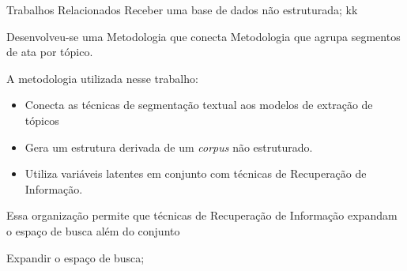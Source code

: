\begin{frame}{Trabalhos Relacionados}
Receber uma base de dados não estruturada;
kk


Desenvolveu-se uma
Metodologia que conecta 
Metodologia que agrupa segmentos de ata por tópico.


A metodologia utilizada nesse trabalho: 
\begin{itemize}
	\item Conecta as técnicas de segmentação textual aos modelos de extração de tópicos 
	\item Gera um estrutura derivada de um \textit{corpus} não estruturado.
	\item Utiliza variáveis latentes em conjunto com técnicas de Recuperação de Informação.
\end{itemize}


Essa organização permite
que técnicas de Recuperação de Informação expandam o espaço de busca além do conjunto


Expandir o espaço de busca; 
















\end{frame}
